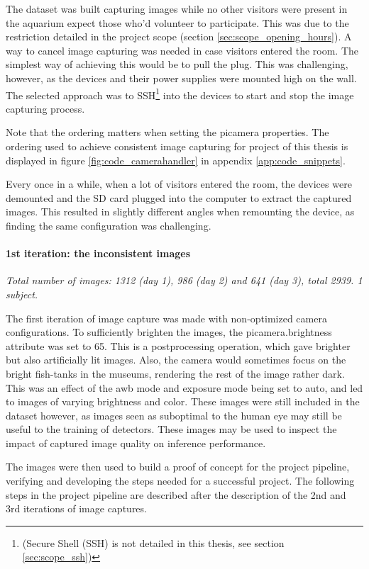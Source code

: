 The dataset was built capturing images while no other visitors were present in the aquarium expect those who'd volunteer to participate. This was due to the restriction detailed in the project scope (section \ref{sec:scope_opening_hours}). A way to cancel image capturing was needed in case visitors entered the room. The simplest way of achieving this would be to pull the plug. This was challenging, however, as the devices and their power supplies were mounted high on the wall. The selected approach was to SSH\footnote{(Secure Shell (SSH) is not detailed in this thesis, see section \ref{sec:scope_ssh})} into the devices to start and stop the image capturing process.

Note that the ordering matters when setting the picamera properties. The ordering used to achieve consistent image capturing for project of this thesis is displayed in figure \ref{fig:code_camerahandler} in appendix \ref{app:code_snippets}.

Every once in a while, when a lot of visitors entered the room, the devices were demounted and the SD card plugged into the computer to extract the captured images. This resulted in slightly different angles when remounting the device, as finding the same configuration was challenging.

\paragraph{1st iteration: the inconsistent images}
\textit{Total number of images: 1312 (day 1), 986 (day 2) and 641 (day 3), total 2939. 1 subject.}

The first iteration of image capture was made with non-optimized camera configurations. To sufficiently brighten the images, the picamera.brightness attribute was set to 65. This is a postprocessing operation, which gave brighter but also artificially lit images. Also, the camera would sometimes focus on the bright fish-tanks in the museums, rendering the rest of the image rather dark. This was an effect of the awb mode and exposure mode being set to auto, and led to images of varying brightness and color. These images were still included in the dataset however, as images seen as suboptimal to the human eye may still be useful to the training of detectors. These images may be used to inspect the impact of captured image quality on inference performance.

The images were then used to build a proof of concept for the project pipeline, verifying and developing the steps needed for a successful project. The following steps in the project pipeline are described after the description of the 2nd and 3rd iterations of image captures.

